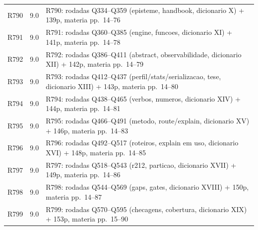 \begin{longtable}{p{1.1cm}p{1.2cm}p{12.2cm}}
R790 & 9.0 & \parbox[t]{12cm}{\raggedright\footnotesize R790: rodadas Q334--Q359 (episteme, handbook, dicionario X) + 139p, materia pp.\ 14--76} \\
R791 & 9.0 & \parbox[t]{12cm}{\raggedright\footnotesize R791: rodadas Q360--Q385 (engine, funcoes, dicionario XI) + 141p, materia pp.\ 14--78} \\
R792 & 9.0 & \parbox[t]{12cm}{\raggedright\footnotesize R792: rodadas Q386--Q411 (abstract, observabilidade, dicionario XII) + 142p, materia pp.\ 14--79} \\
R793 & 9.0 & \parbox[t]{12cm}{\raggedright\footnotesize R793: rodadas Q412--Q437 (perfil/stats/serializacao, tese, dicionario XIII) + 143p, materia pp.\ 14--80} \\
R794 & 9.0 & \parbox[t]{12cm}{\raggedright\footnotesize R794: rodadas Q438--Q465 (verbos, numeros, dicionario XIV) + 144p, materia pp.\ 14--81} \\
R795 & 9.0 & \parbox[t]{12cm}{\raggedright\footnotesize R795: rodadas Q466--Q491 (metodo, route/explain, dicionario XV) + 146p, materia pp.\ 14--83} \\
R796 & 9.0 & \parbox[t]{12cm}{\raggedright\footnotesize R796: rodadas Q492--Q517 (roteiros, explain em uso, dicionario XVI) + 148p, materia pp.\ 14--85} \\
R797 & 9.0 & \parbox[t]{12cm}{\raggedright\footnotesize R797: rodadas Q518--Q543 (r212, particao, dicionario XVII) + 149p, materia pp.\ 14--86} \\
R798 & 9.0 & \parbox[t]{12cm}{\raggedright\footnotesize R798: rodadas Q544--Q569 (gaps, gates, dicionario XVIII) + 150p, materia pp.\ 14--87} \\
R799 & 9.0 & \parbox[t]{12cm}{\raggedright\footnotesize R799: rodadas Q570--Q595 (checagens, cobertura, dicionario XIX) + 153p, materia pp.\ 15--90} \\
\bottomrule
\end{longtable}
\noindent{}